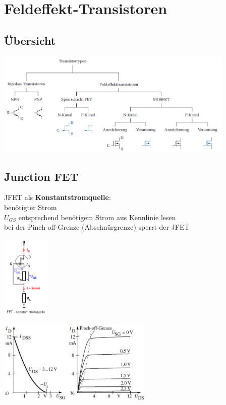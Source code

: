 
\section{Feldeffekt-Transistoren}
	\subsection{Übersicht}
		\includegraphics[height=5cm]{images/Transistortypen}
		
    \subsection{Junction FET}
            \begin{minipage}[T]{8cm}
                JFET als {\bf Konstantstromquelle}:\\
                benötigter Strom \\
                $U_{GS}$ entsprechend benötigem Strom aus Kennlinie lesen\\
                bei der Pinch-off-Grenze (Abschnürgrenze) sperrt der JFET
            \end{minipage}
            \begin{minipage}[T]{3.4cm}
                \includegraphics[height=4cm]{./images/JFETCCQuelle.png}
            \end{minipage}
            \begin{minipage}[T]{6cm}
                \includegraphics[height=4cm]{./images/JFETKennlinie.png}
            \end{minipage}
            
